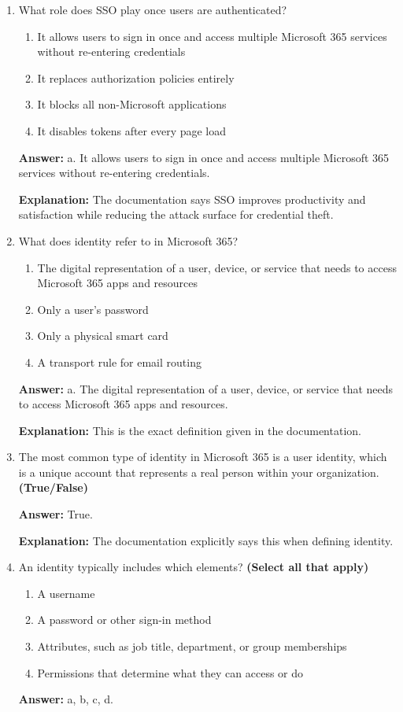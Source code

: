 \documentclass[10pt]{article}
\begin{document}
\begin{enumerate}[leftmargin=*]
\item What role does SSO play once users are authenticated?
\begin{enumerate}[label=\alph*., leftmargin=1.5em]
\item It allows users to sign in once and access multiple Microsoft 365 services without re-entering credentials
\item It replaces authorization policies entirely
\item It blocks all non-Microsoft applications
\item It disables tokens after every page load
\end{enumerate}
\textbf{Answer:} a. It allows users to sign in once and access multiple Microsoft 365 services without re-entering credentials.

\textbf{Explanation:} The documentation says SSO improves productivity and satisfaction while reducing the attack surface for credential theft.

\item What does identity refer to in Microsoft 365?
\begin{enumerate}[label=\alph*., leftmargin=1.5em]
\item The digital representation of a user, device, or service that needs to access Microsoft 365 apps and resources
\item Only a user’s password
\item Only a physical smart card
\item A transport rule for email routing
\end{enumerate}
\textbf{Answer:} a. The digital representation of a user, device, or service that needs to access Microsoft 365 apps and resources.

\textbf{Explanation:} This is the exact definition given in the documentation.

\item The most common type of identity in Microsoft 365 is a user identity, which is a unique account that represents a real person within your organization. \textbf{(True/False)}

\textbf{Answer:} True.

\textbf{Explanation:} The documentation explicitly says this when defining identity.

\item An identity typically includes which elements? \textbf{(Select all that apply)}
\begin{enumerate}[label=\alph*., leftmargin=1.5em]
\item A username
\item A password or other sign-in method
\item Attributes, such as job title, department, or group memberships
\item Permissions that determine what they can access or do
\end{enumerate}
\textbf{Answer:} a, b, c, d.


\end{enumerate}
\end{document}
